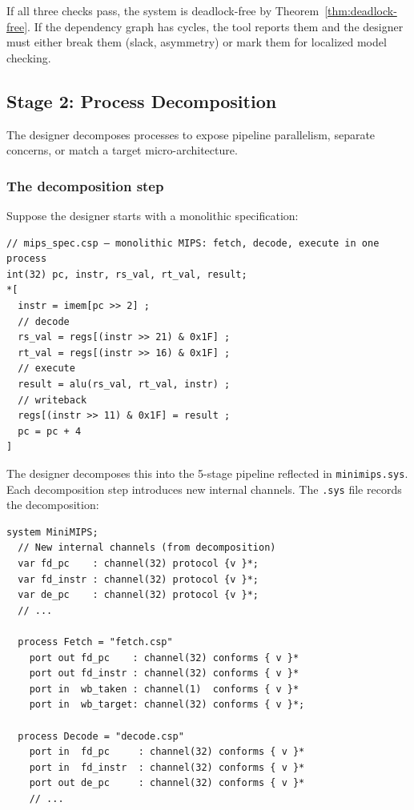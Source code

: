 \documentclass[11pt]{article}
\begin{document}
If all three checks pass, the system is deadlock-free by
Theorem~\ref{thm:deadlock-free}.  If the dependency graph has cycles,
the tool reports them and the designer must either break them
(slack, asymmetry) or mark them for localized model checking.

\subsection{Stage 2: Process Decomposition}
\label{sec:stage2}

The designer decomposes processes to expose pipeline parallelism, separate
concerns, or match a target micro-architecture.

\subsubsection{The decomposition step}

Suppose the designer starts with a monolithic specification:

\begin{Verbatim}[samepage=true]
// mips_spec.csp — monolithic MIPS: fetch, decode, execute in one process
int(32) pc, instr, rs_val, rt_val, result;
*[
  instr = imem[pc >> 2] ;
  // decode
  rs_val = regs[(instr >> 21) & 0x1F] ;
  rt_val = regs[(instr >> 16) & 0x1F] ;
  // execute
  result = alu(rs_val, rt_val, instr) ;
  // writeback
  regs[(instr >> 11) & 0x1F] = result ;
  pc = pc + 4
]
\end{Verbatim}

The designer decomposes this into the 5-stage pipeline reflected in
\texttt{minimips.sys}.  Each decomposition step introduces new
internal channels.  The \texttt{.sys} file records the decomposition:

\begin{Verbatim}[samepage=true]
system MiniMIPS;
  // New internal channels (from decomposition)
  var fd_pc    : channel(32) protocol {v }*;
  var fd_instr : channel(32) protocol {v }*;
  var de_pc    : channel(32) protocol {v }*;
  // ...

  process Fetch = "fetch.csp"
    port out fd_pc    : channel(32) conforms { v }*
    port out fd_instr : channel(32) conforms { v }*
    port in  wb_taken : channel(1)  conforms { v }*
    port in  wb_target: channel(32) conforms { v }*;

  process Decode = "decode.csp"
    port in  fd_pc     : channel(32) conforms { v }*
    port in  fd_instr  : channel(32) conforms { v }*
    port out de_pc     : channel(32) conforms { v }*
    // ...
\end{Verbatim}
\end{document}

